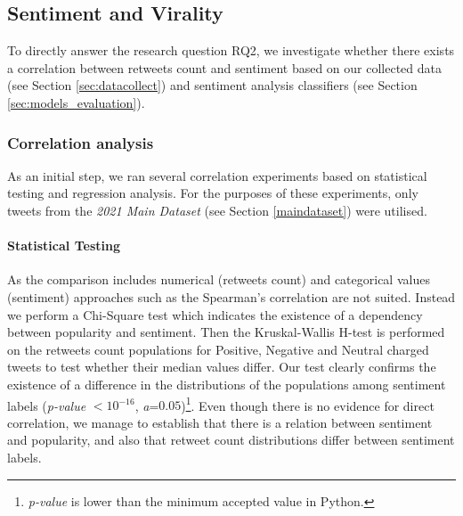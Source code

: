 \begin{table}[hbt!]
\centering
{}
\caption{Percentiles of retweet counts for UK, Spanish and Greek parliaments from January to December 2021. Highlighted are the percentiles used for determining if a tweet belongs in the `Head' or `Tail'.}
\label{tab:tweets_percentiles}
\end{table}


\subsection{Sentiment and Virality}
\label{sec:sentvir}

To directly answer the research question RQ2, we investigate whether there exists a correlation between retweets count and sentiment based on our collected data (see Section \ref{sec:datacollect}) and sentiment analysis classifiers (see Section \ref{sec:models_evaluation}).

\subsubsection{Correlation analysis}

As an initial step, we ran several correlation experiments based on statistical testing and regression analysis. For the purposes of these experiments, only tweets from the \textit{2021 Main Dataset} (see Section \ref{maindataset}) were utilised.

\paragraph{Statistical Testing} As the comparison includes numerical (retweets count) and categorical values (sentiment) approaches such as the Spearman's correlation are not suited. Instead we perform a Chi-Square test which indicates the existence of a dependency between popularity and sentiment. Then the Kruskal-Wallis H-test is performed on the retweets count populations for Positive, Negative and Neutral charged tweets to test whether their median values differ. Our test clearly confirms the existence of a difference in the distributions of the populations among sentiment labels (\textit{p-value} $<10^{-16}$, \textit{a}=$0.05$)\footnote{\textit{p-value} is lower than the minimum accepted value in Python.}. Even though there is no evidence for direct correlation, we manage to establish that there is a relation between sentiment and popularity, and also that retweet count distributions differ between sentiment labels.


